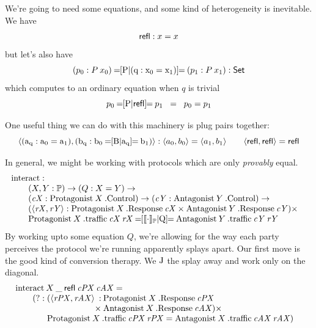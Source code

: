 \documentclass{book}
\newcommand{\D}[1]{\blue{\ensuremath{\mathsf{#1}}}}
\newcommand{\F}[1]{\green{\ensuremath{\mathrm{#1}}}}
\newcommand{\N}[1]{\black{\ensuremath{#1}}}
\newcommand{\SET}{\D{\mathsf{Set}}}
\newcommand{\pr}[2]{\red{\langle\N{#1},\N{#2}\rangle}}
\begin{document}
We're going to need some equations, and some kind of heterogeneity is inevitable. We have
\[
\refl : x\EQ x
\]
but let's also have
\[
\heq{P}{(q : x_0\EQ x_1)}{(p_0:P\:x_0)}{(p_1:P\:x_1)} : \SET
\]
which computes to an ordinary equation when $q$ is trivial
\[
\heq{P}{\refl}{p_0}{p_1} \;\;=\;\; p_0\EQ p_1 
\]

\newcommand{\prq}[2]{\F{\langle\N{#1},\N{#2}\rangle}}
One useful thing we can do with this machinery is plug pairs together:
\[
\prq{(a_q : a_0 = a_1)}{(b_q : \heq{B}{a_q}{b_0}{b_1})} :
\pr{a_0}{b_0} \EQ \pr{a_1}{b_1} \qquad
\prq{\refl}{\refl} = \refl
\]

In general, we might be working with protocols which are only \emph{provably} equal.
\[\begin{array}{@{}l}
\F{interact} :\\
\qquad\begin{array}[t]{@{}l}
  (X, Y:\Protocol)\to (Q:X\EQ Y) \to\\
  (\mathit{cX}:\Play{X}\:.\F{Control}) \to
  (\mathit{cY}:\Oppo{Y}\:.\F{Control}) \to\\
  (\pr{\mathit{rX}}{\mathit{rY}}:\Play{X}\:.\F{Response}\:\mathit{cX} \times
                                 \Oppo{Y}\:.\F{Response}\:\mathit{cY}) \times\\
    \heq{\protocol{\cdot}}{Q}
        {\Play{X}\:.\F{traffic}\:\mathit{cX}\:\mathit{rX}}
        {\Oppo{Y}\:.\F{traffic}\:\mathit{cY}\:\mathit{rY}}
\end{array}
\end{array}
\]
By working upto some equation $Q$, we're allowing for the way each party
perceives the protocol we're running apparently splays apart. Our first move is the
good kind of conversion therapy. We $\F{J}$ the splay away and work only on the diagonal.
\[\begin{array}{@{}l}
\F{interact}\:X\:\_\:\refl\:\mathit{cPX}\:\mathit{cAX} =\\
\qquad(? : \begin{array}[t]{@{}l}
  (\pr{\mathit{rPX}}{\mathit{rAX}}
  \begin{array}[t]{@{}r@{\:}l}:&\Play{X}\:.\F{Response}\:\mathit{cPX}\\
    \times & \Oppo{X}\:.\F{Response}\:\mathit{cAX}) \times
    \end{array}\\
    \Play{X}\:.\F{traffic}\:\mathit{cPX}\:\mathit{rPX} \EQ
    \Oppo{X}\:.\F{traffic}\:\mathit{cAX}\:\mathit{rAX})
    \end{array}
\end{array}\]
\end{document}
